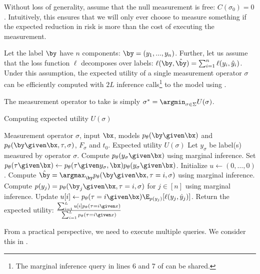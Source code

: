 Without loss of generality, assume that the null measurement is free: $C(\sigma_0) = 0$.
Intuitively, this ensures that we will only ever choose to measure something if the expected reduction in risk is more than the cost of executing the measurement.

Let the label $\by$ have $n$ components: $\by = (y_1, ..., y_n)$.
Further, let us assume that the loss function $\ell$ decomposes over labels: $\ell(\by, \byt) = \sum_{i=1}^n \ell(y_i, \yt_i)$. 
Under this assumption, the expected utility of a single measurement operator $\sigma$ can be efficiently computed with $2L$ inference calls\footnote{The marginal inference query in lines 6 and 7 of  can be shared.} to the model using .

The measurement operator to take is simply $\sigma^* = \argmin_{\sigma \in \Sigma} U(\sigma)$.

\begin{algorithm}
\renewcommand{\algorithmicrequire}{\textbf{Input:}}
\renewcommand{\algorithmicensure}{\textbf{Output:}}
  \caption{Computing expected utility $U(\sigma)$}
  \label{algo:expected-utility}
  \begin{algorithmic}[1]
    \REQUIRE Measurement operator $\sigma$, input $\bx$, models $p_\theta(\by \given \bx)$ and $p_\theta(\by \given \bx, \tau, \sigma)$, $F_\sigma$ and $t_0$.
    \ENSURE Expected utility $U(\sigma)$
    \STATE Let $y_\sigma$ be label(s) measured by operator $\sigma$.
    \STATE Compute $p_\theta(y_\sigma \given \bx)$ using marginal inference.
    \STATE Set $p_\theta(\tau \given \bx) \gets p_\theta(\tau \given y_\sigma, \bx) p_\theta(y_\sigma \given \bx)$.
    \STATE Initialize $u \gets (0, \dots, 0)$.
    \STATE Compute $\byt = \argmax_{\by} p_\theta(\by \given \bx, \tau = i, \sigma)$ using marginal inference.
    \STATE Compute $p(y_j) = p_\theta(\by_j \given \bx, \tau = i, \sigma)$ for $j \in [n]$ using marginal inference.
    \STATE Update $u[i] \gets \p(\tau = i \given \bx) \E_{p(y_j)}[\ell(y_j, \yt_j)]$.
    \ENDFOR
    \STATE Return the expected utility: $\frac{\sum_{i=1}^L u[i] p_\theta(\tau = i \given x)}{\sum_{i=1}^L p_\theta(\tau = i \given x)}$
  \end{algorithmic}
\end{algorithm}

From a practical perspective, we need to execute multiple queries. We consider this in .



